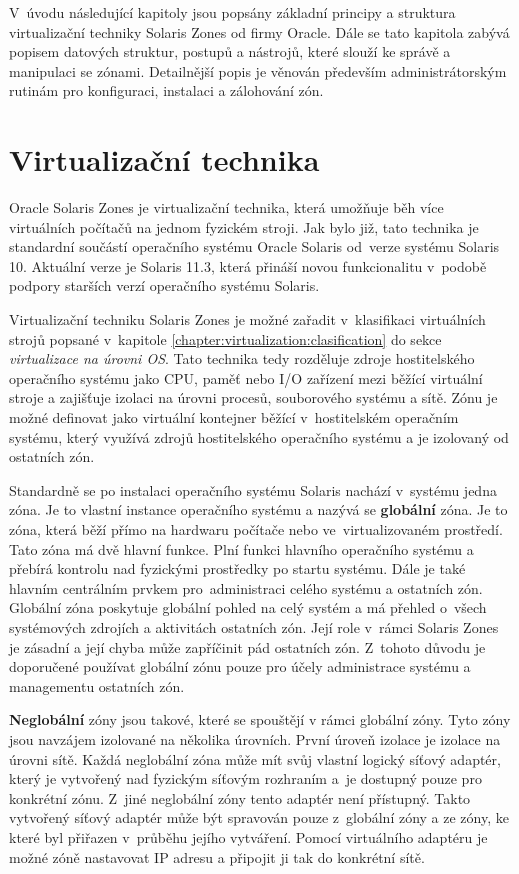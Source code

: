 V~úvodu následující kapitoly jsou popsány základní principy a struktura virtualizační techniky Solaris Zones od
firmy Oracle. Dále se tato kapitola zabývá popisem datových struktur, postupů a nástrojů, které slouží ke správě a manipulaci
se zónami. Detailnější popis je věnován především administrátorským rutinám pro konfiguraci, instalaci a zálohování zón.
\section{Virtualizační technika}
\label{chapter:zones:technique}
Oracle Solaris Zones je virtualizační technika, která umožňuje běh více virtuálních počítačů na jednom fyzickém stroji. Jak
bylo již, tato technika je standardní součástí operačního systému Oracle Solaris od~verze systému Solaris 10.
Aktuální verze je Solaris 11.3, která přináší novou funkcionalitu v~podobě podpory starších verzí operačního systému Solaris.

Virtualizační techniku Solaris Zones je možné zařadit v~klasifikaci virtuálních strojů popsané v~kapitole \ref{chapter:virtualization:clasification}
do sekce \textit{virtualizace na úrovni OS}. Tato technika tedy rozděluje zdroje hostitelského
operačního systému jako CPU, paměť nebo I/O zařízení mezi běžící virtuální stroje a zajišťuje izolaci na úrovni procesů,
souborového systému a sítě. Zónu je možné definovat jako virtuální kontejner běžící v~hostitelském operačním systému, který
využívá zdrojů hostitelského operačního systému a je izolovaný od ostatních zón.

Standardně se po instalaci operačního systému Solaris nachází v~systému jedna zóna. Je to vlastní instance operačního systému
a nazývá se \textbf{globální} zóna. Je to zóna, která běží přímo na hardwaru počítače nebo ve~virtualizovaném
prostředí. Tato zóna má dvě hlavní funkce. Plní funkci hlavního operačního systému a přebírá kontrolu
nad fyzickými prostředky po startu systému. Dále je také hlavním centrálním prvkem pro~administraci celého systému a ostatních
zón. Globální zóna poskytuje globální pohled na celý systém a má přehled o~všech systémových zdrojích a aktivitách ostatních
zón. Její role v~rámci Solaris Zones je zásadní a její chyba může zapříčinit pád ostatních zón. Z~tohoto důvodu je doporučené
používat globální zónu pouze pro účely administrace systému a managementu ostatních zón.

\textbf{Neglobální} zóny jsou takové, které se spouštějí v rámci globální zóny. Tyto zóny jsou navzájem izolované na
několika úrovních. První úroveň izolace je izolace na úrovni sítě. Každá neglobální zóna může mít svůj vlastní logický síťový
adaptér, který je vytvořený nad fyzickým síťovým rozhraním a~je dostupný pouze pro konkrétní zónu. Z~jiné neglobální
zóny tento adaptér není přístupný. Takto vytvořený síťový adaptér může být spravován pouze z~globální zóny a ze zóny, ke které
byl přiřazen v~průběhu jejího vytváření. Pomocí virtuálního adaptéru je možné zóně nastavovat IP adresu a připojit ji tak
do konkrétní sítě.

